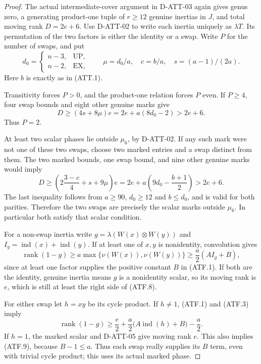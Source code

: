 \begin{proof}
The actual intermediate-cover argument in D-ATT-03 again gives
genus zero, a generating product-one tuple of $r\ge12$ genuine
inertias in $J$, and total moving rank $D=2e+6$.
Use D-ATT-02 to write each inertia uniquely as $\lambda T$.
Its permutation of the two factors is either the identity
or a swap. Write $P$ for the number of swaps, and put
\[
 d_0=\begin{cases}n-3,&\mathrm{UP},\\n-2,&\mathrm{EX},\end{cases}
 \qquad \mu=d_0/a,\quad c=b/a,\quad s=(a-1)/(2a).          \tag{ATF.5}
\]
Here $b$ is exactly as in (ATT.1).

Transitivity forces $P>0$, and the product-one relation
forces $P$ even. If $P\ge4$, four swap bounds and eight
other genuine marks give
\[
    D\ge(4s+8\mu)e
      =2e+a(8d_0-2)>2e+6.                                \tag{ATF.6}
\]
Thus $P=2$.

At least two scalar phases lie outside $\mu_6$, by D-ATT-02.
If any such mark were not one of these two swaps, choose
two marked entries and a swap distinct from them. The two
marked bounds, one swap bound, and nine other genuine marks
would imply
\[
 D\ge\left(2\frac{3-c}{4}+s+9\mu\right)e
      =2e+a\left(9d_0-\frac{b+1}{2}\right)>2e+6.           \tag{ATF.7}
\]
The last inequality follows from $a\ge90$, $d_0\ge12$ and
$b\le d_0$, and is valid for both parities. Therefore the
two swaps are precisely the scalar marks outside $\mu_6$.
In particular both satisfy that scalar condition.

For a non-swap inertia write
$g=\lambda(W(x)\otimes W(y))$ and
$I_g=\operatorname{ind}(x)+\operatorname{ind}(y)$.
If at least one of $x,y$ is nonidentity, convolution gives
\[
 \operatorname{rank}(1-g)
  \ge a\max\{\nu(W(x)),\nu(W(y))\}
  \ge\frac a2(AI_g+B),                                  \tag{ATF.8}
\]
since at least one factor supplies the positive constant $B$
in (ATF.1). If both are the identity, genuine inertia means
$g$ is a nonidentity scalar, so its moving rank is $e$,
which is still at least the right side of (ATF.8).

For either swap let $h=xy$ be its cycle product. If $h\ne1$,
(ATF.1) and (ATF.3) imply
\[
 \operatorname{rank}(1-g)
   \ge\frac e2+\frac a2\big(A\operatorname{ind}(h)+B\big)
                         -\frac a2.                       \tag{ATF.9}
\]
If $h=1$, the marked scalar and D-ATT-05 give moving rank
$e$. This also implies (ATF.9), because $B-1\le a$.
Thus each swap really supplies its $B$ term, even with
trivial cycle product; this uses its actual marked phase.


\end{proof}
